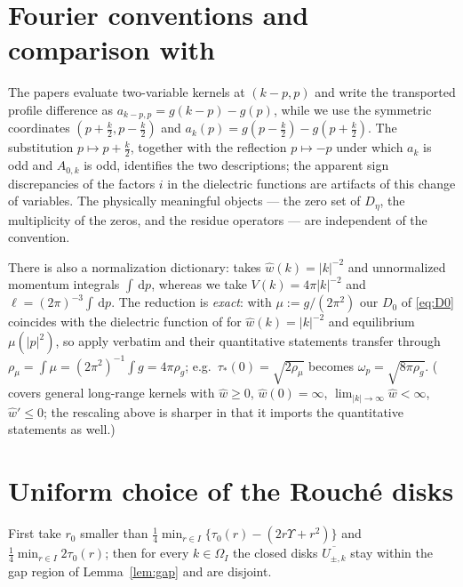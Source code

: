 \documentclass[11pt,a4paper]{amsart}
\theoremstyle{definition}
\theoremstyle{remark}
\newcommand{\dd}{\,\mathrm{d}}
\newcommand{\ellf}{\ell}
\begin{document}
\appendix

\section{Fourier conventions and comparison with \texorpdfstring{\cite{NY1,NY2}}{Nguyen--You}}\label{app:conventions}

The papers \cite{NY1,NY2} evaluate two-variable kernels at $(k-p,p)$ and write the transported profile difference as $a_{k-p,p}=g(k-p)-g(p)$, while we use the symmetric coordinates $(p+\frac k2,p-\frac k2)$ and $a_k(p)=g(p-\frac k2)-g(p+\frac k2)$. The substitution $p\mapsto p+\frac k2$, together with the reflection $p\mapsto-p$ under which $a_k$ is odd and $A_{0,k}$ is odd, identifies the two descriptions; the apparent sign discrepancies of the factors $i$ in the dielectric functions are artifacts of this change of variables. The physically meaningful objects --- the zero set of $D_\eta$, the multiplicity of the zeros, and the residue operators --- are independent of the convention.

There is also a normalization dictionary: \cite{NY1} takes $\widehat w(k)=|k|^{-2}$ and unnormalized momentum integrals $\int\dd p$, whereas we take $V(k)=4\pi|k|^{-2}$ and $\ellf=(2\pi)^{-3}\int\dd p$. The reduction is \emph{exact}: with $\mu:=g/(2\pi^2)$ our $D_0$ of \eqref{eq:D0} coincides with the dielectric function of \cite{NY1} for $\widehat w(k)=|k|^{-2}$ and equilibrium $\mu(|p|^2)$, so \cite[Theorems~1.1 and~2.6]{NY1} apply verbatim and their quantitative statements transfer through $\rho_\mu=\int\mu=(2\pi^2)^{-1}\int g=4\pi\rho_g$; e.g.\ $\tau_*(0)=\sqrt{2\rho_\mu}$ becomes $\omega_p=\sqrt{8\pi\rho_g}$. (\cite[Remark~2.8]{NY1} covers general long-range kernels with $\widehat w\ge0$, $\widehat w(0)=\infty$, $\lim_{|k|\to\infty}\widehat w<\infty$, $\widehat w'\le0$; the rescaling above is sharper in that it imports the quantitative statements as well.)

\section{Uniform choice of the Rouch\'e disks}\label{app:disks}

First take $r_0$ smaller than $\tfrac14\min_{r\in I}\{\tau_0(r)-(2r\Upsilon+r^2)\}$ and $\tfrac14\min_{r\in I}2\tau_0(r)$; then for every $k\in\Omega_I$ the closed disks $\overline{U_{\pm,k}}$ stay within the gap region of Lemma~\ref{lem:gap} and are disjoint.
\end{document}
